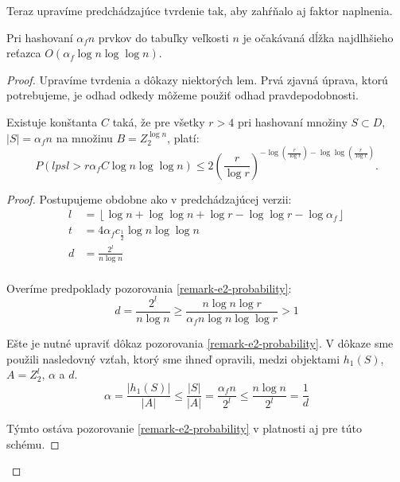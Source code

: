 Teraz upravíme predchádzajúce tvrdenie tak, aby zahŕňalo aj faktor naplnenia. 
\begin{theorem}
\label{theorem-n-to-n}
Pri hashovaní $\alpha_f n$ prvkov do tabuľky veľkosti $n$ je očakávaná dĺžka najdlhšieho reťazca $O(\alpha_f \log n \log \log n)$.
\end{theorem}
\begin{proof}
Upravíme tvrdenia a dôkazy niektorých lem. Prvá zjavná úprava, ktorú potrebujeme, je odhad odkedy môžeme použiť odhad pravdepodobnosti.

\begin{remark}
Existuje konštanta $C$ taká, že pre všetky $r > 4$ pri hashovaní množiny $S \subset D$, $|S| = \alpha_f n$ na množinu $B = Z_2^{\log n}$, platí:
\begin{displaymath}
P(lpsl > r \alpha_f C \log n \log \log n) \leq 2 \left(\frac{r}{\log r}\right)^{-\log \left(\frac{r}{\log r}\right) - \log \log \left(\frac{r}{\log r}\right)}\textit{.}
\end{displaymath}
\end{remark}
\begin{proof}
Postupujeme obdobne ako v predchádzajúcej verzii:
\begin{displaymath}
\begin{split}
l & = \left\lfloor \log n + \log \log n + \log r - \log \log r - \log \alpha_f \right\rfloor \\
t & = 4\alpha_f c_{\frac{1}{2}} \log n \log \log n \\
d & = \frac{2^l}{n \log n} \\
\end{split}
\end{displaymath}

Overíme predpoklady pozorovania \ref{remark-e2-probability}:
\begin{displaymath}
d = \frac{2^l}{n \log n} \geq \frac{n \log n \log r}{\alpha_f n \log n \log \log r} > 1
\end{displaymath}

Ešte je nutné upraviť dôkaz pozorovania \ref{remark-e2-probability}. V dôkaze sme použili nasledovný vzťah, ktorý sme ihneď opravili, medzi objektami $h_1(S)$, $A = Z_2^l$, $\alpha$ a $d$.
\begin{displaymath}
\alpha = \frac{|h_1(S)|}{|A|}\leq \frac{|S|}{|A|} = \frac{\alpha_f n}{2^l} \leq \frac{n \log n}{2^l} = \frac{1}{d}
\end{displaymath}

Týmto ostáva pozorovanie \ref{remark-e2-probability} v platnosti aj pre túto schému.


\end{proof}
\end{proof}
